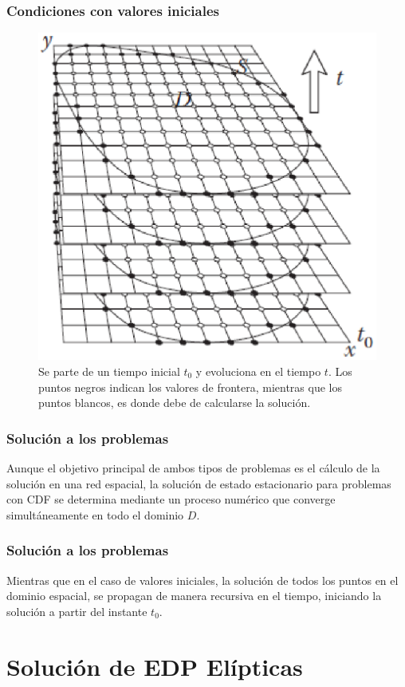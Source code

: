 \documentclass[12pt]{beamer}
\begin{document}
\begin{frame}
\captionsetup{font=scriptsize,labelfont=scriptsize}
\frametitle{Condiciones con valores iniciales}
\begin{figure}
	\centering
	\includegraphics[scale=0.45]{Imagenes/condicionesEDP_02.eps}
	\caption{Se parte de un tiempo inicial $t_{0}$ y evoluciona en el tiempo $t$. Los puntos negros indican los valores de frontera, mientras que los puntos blancos, es donde debe de calcularse la solución.}
\end{figure}
\end{frame}
\begin{frame}
\frametitle{Solución a los problemas}
Aunque el objetivo principal de ambos tipos de problemas es el cálculo de la solución en una red espacial, la solución de estado estacionario para problemas con CDF se determina mediante un proceso numérico que converge simultáneamente en todo el dominio $D$.
\end{frame}
\begin{frame}
\frametitle{Solución a los problemas}
Mientras que en el caso de valores iniciales, la solución de todos los puntos en el dominio espacial, se propagan de manera recursiva en el tiempo, iniciando la solución a partir del instante $t_{0}$.
\end{frame}
\section{Solución de EDP Elípticas}
\end{document}
